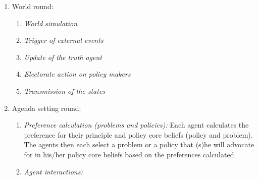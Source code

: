 \begin{enumerate}
\item World round:
	
	\begin{enumerate}
	\item \emph{World simulation}
	\item \emph{Trigger of external events}
	\item \emph{Update of the truth agent}
	\item \emph{Electorate action on policy makers}
	\item \emph{Transmission of the states}
	\end{enumerate}
	
\item Agenda setting round:


	\begin{enumerate}
	\item \emph{Preference calculation (problems and policies):} Each agent calculates the preference for their principle and policy core beliefs (policy and problem). The agents then each select a problem or a policy that (s)he will advocate for in his/her policy core beliefs based on the preferences calculated.
	\item \emph{Agent interactions:} 



\end{enumerate}
\end{enumerate}
